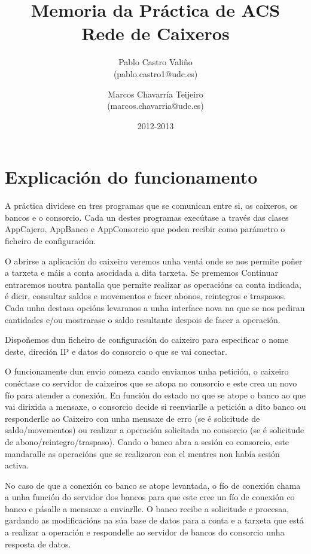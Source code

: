\documentclass[a4paper,titlepage]{article}
\begin{document}
\title{\Huge{Memoria da Práctica de ACS} \\ \small{Rede de Caixeros}}
\author{Pablo Castro Valiño \\ \small{(pablo.castro1@udc.es)} \and
Marcos Chavarría Teijeiro \\ \small{(marcos.chavarria@udc.es)}}
\date{2012-2013}
\maketitle

\tableofcontents

\newpage

\section {Explicación do funcionamento}
A práctica dividese en tres programas que se comunican entre si, os caixeros, os bancos e o consorcio. Cada un destes programas execútase a través das clases AppCajero, AppBanco e AppConsorcio que poden recibir como parámetro o ficheiro de configuración.

O abrirse a aplicación do caixeiro veremos unha ventá onde se nos permite poñer a tarxeta e máis a conta asocidada a dita tarxeta. Se prememos  Continuar entraremos noutra pantalla que permite realizar as operacións ca conta indicada, é dicir, consultar saldos e movementos e facer abonos, reintegros e traspasos. Cada unha destasa opcións levaranos a unha interface nova na que se nos pediran cantidades e/ou mostrarase o saldo resultante despois de facer a operación.

Dispoñemos dun ficheiro de configuración do caixeiro para especificar o nome deste, direción IP e datos do consorcio o que se vai conectar.

O funcionamente dun envio comeza cando enviamos unha petición, o caixeiro conéctase co servidor de caixeiros que se atopa no consorcio e este crea un novo fío para atender a conexión.
En función do estado no que se atope o banco ao que vai dirixida a mensaxe, o consorcio decide si reenviarlle a petición a dito banco ou responderlle ao Caixeiro con unha mensaxe de erro (se é solicitude de saldo/movementos) ou realizar a operación solicitada no consorcio (se é solicitude de abono/reintegro/traspaso). Cando o banco abra a sesión co consorcio, este mandaralle as operacións que se realizaron con el mentres non había sesión activa.

No caso de que a conexión co banco se atope levantada, o fío de conexión chama a unha función do servidor dos bancos para que este cree un fío de conexión co banco e pásalle a mensaxe a enviarlle.
O banco recibe a solicitude e procesaa, gardando as modificacións na súa base de datos para a conta e a tarxeta que está a realizar a operación e respondelle ao servidor de bancos do consorcio unha resposta de datos.
\end{document}
